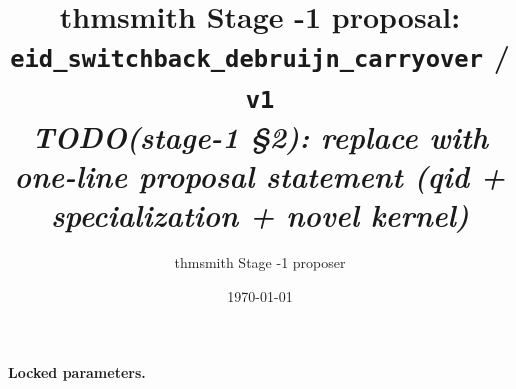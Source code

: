 \documentclass[11pt]{article}
\title{thmsmith Stage -1 proposal: \texttt{eid\_switchback\_debruijn\_carryover} / \texttt{v1}%
  \\ \large\textit{TODO(stage-1 \S2): replace with one-line proposal statement (qid + specialization + novel kernel)}}
\author{thmsmith Stage -1 proposer}
\date{\today}
\theoremstyle{definition}
\theoremstyle{plain}
\theoremstyle{remark}
\begin{document}
\maketitle


\paragraph{Locked parameters.}

\begin{abstract}
\end{abstract}
\end{document}
